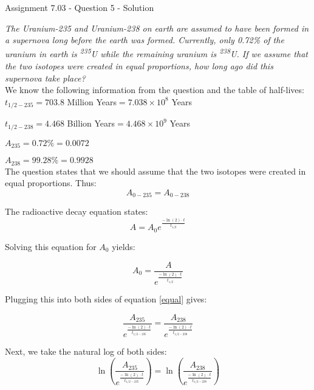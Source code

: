 \documentclass[letterpaper, 12pt]{article}
\newcommand{\assnum}{Assignment 7.03}
\newcommand{\assname}{Question 5 \color{red} - Solution\color{black}}
\begin{document}
\fancyfoot[r]{\assnum}	


\begin{center} \assnum{} - \assname{}
\end{center}
\textit{The Uranium-235 and Uranium-238 on earth are assumed to have been formed in a supernova long before the earth was formed.  Currently, only 0.72\% of the uranium in earth is \textsuperscript{235}U while the remaining uranium is \textsuperscript{238}U.  If we assume that the two isotopes were created in equal proportions, how long ago did this supernova take place?}
\\

We know the following information from the question and the table of half-lives:
\\

$t_{1/2-235} = 703.8$ Million Years$ = 7.038 \times 10^8$ Years

$t_{1/2-238} = 4.468$ Billion Years$ = 4.468 \times 10^9$ Years

$A_{235} = 0.72\% = 0.0072 $

$A_{238} = 99.28\% = 0.9928$
\\

The question states that we should assume that the two isotopes were created in equal proportions.  Thus:  
\begin{equation}
A_{0-235} = A_{0-238}
\label{equal}
\end{equation}

The radioactive decay equation states:
\begin{equation}
A = A_0 e^{\frac{-\ln(2)\cdot t}{t_{1/2}}}
\end{equation}

Solving this equation for $A_0$ yields:


\begin{equation}
A_0 = \frac{A}{e^{\frac{-\ln(2)\cdot t}{t_{1/2}}}}
\end{equation}

Plugging this into both sides of equation \ref{equal} gives:

\begin{equation}
\frac{A_{235}}{e^{\frac{-\ln(2)\cdot t}{t_{1/2-235}}}} = \frac{A_{238}}{e^{\frac{-\ln(2)\cdot t}{t_{1/2-238}}}}
\end{equation}

Next, we take the natural log of both sides:
\begin{equation}
\ln\left(\frac{A_{235}}{e^{\frac{-\ln(2)\cdot t}{t_{1/2-235}}}}\right) = \ln\left(\frac{A_{238}}{e^{\frac{-\ln(2)\cdot t}{t_{1/2-238}}}}\right)
\label{naturallog}
\end{equation}
\end{document}
